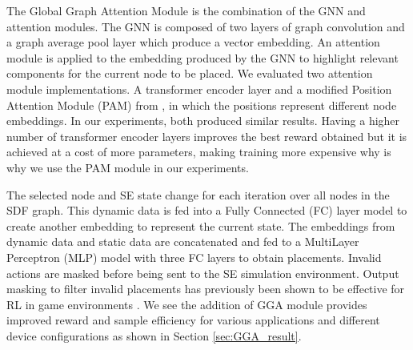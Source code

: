 The Global Graph Attention Module is the combination of the GNN and attention modules.
The GNN is composed of two layers of graph convolution \cite{wu2019simplifying} and a graph average pool layer which produce a vector embedding.
An attention module is applied to the embedding produced by the GNN to highlight relevant components for the current node to be placed. 
We evaluated two attention module implementations. A transformer encoder layer \cite{vaswani2017attention} and a modified Position Attention Module (PAM) from \cite{fu2019dual}, in which the positions represent different node embeddings.
In our experiments, both produced similar results. 
Having a higher number of transformer encoder layers improves the best reward obtained but it is achieved at a cost of more parameters, making training more expensive why is why we use the PAM module in our experiments.

The selected node and SE state change for each iteration over all nodes in the SDF graph. 
This dynamic data is fed into a Fully Connected (FC) layer model to create another embedding to represent the current state. 
The embeddings from dynamic data and static data are concatenated and fed to a MultiLayer Perceptron (MLP) model with three FC layers to obtain placements. 
Invalid actions are masked before being sent to the SE simulation environment. 
Output masking to filter invalid placements has previously been shown to be effective for RL in game environments \cite{Shengyi_mask}. 
We see the addition of GGA module provides improved reward and sample efficiency for various applications and different device configurations as shown in Section \ref{sec:GGA_result}.


